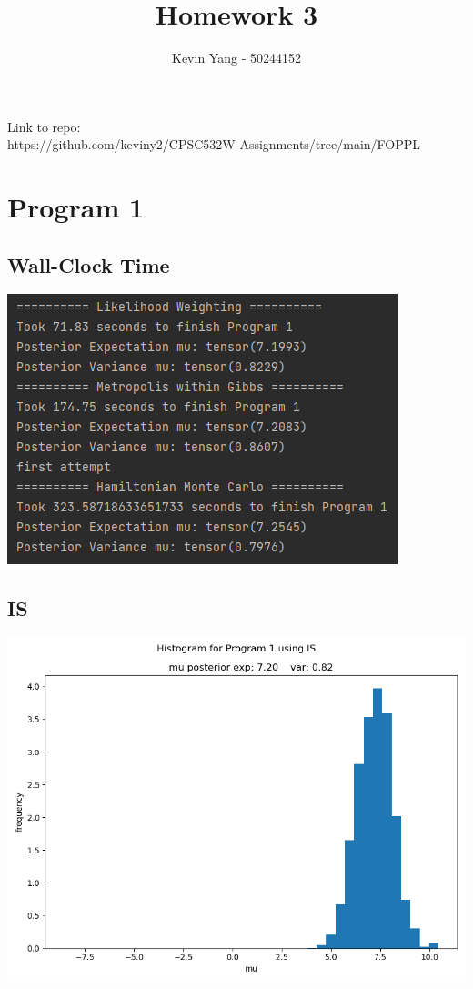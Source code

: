 \documentclass[10pt]{homeworg}
\title{Homework 3}
\author{Kevin Yang - 50244152}
\begin{document}
\maketitle

\Huge{Link to repo:}\\
\Large{https://github.com/keviny2/CPSC532W-Assignments/tree/main/FOPPL}


\section{Program 1}
\subsection{Wall-Clock Time}
\begin{center}
\includegraphics[scale=0.75]{figures/program_1_time.png}
\end{center}

\subsection{IS}
\begin{center}
\includegraphics[scale=0.4]{figures/IS_program_1.png}
\end{center}
\end{document}
